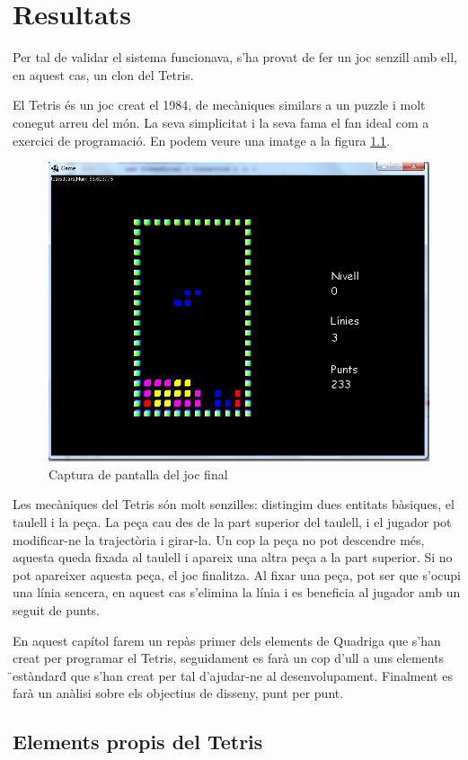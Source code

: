 \chapter{Resultats}
\label{chap:Resultats}

  Per tal de validar el sistema funcionava, s'ha provat de fer un joc senzill amb ell, en aquest cas, un clon del Tetris.
  
  El Tetris és un joc creat el 1984, de mecàniques similars a un puzzle i molt conegut arreu del món. La seva simplicitat i la seva fama el fan ideal com a exercici de programació. En podem veure una imatge a la figura \ref{fig:ImatgeTetris}.
  
  \begin{figure}
    \centering
    \includegraphics[width=0.5\linewidth]{./img/ImatgeTetris.png}
    \caption{Captura de pantalla del joc final \label{fig:ImatgeTetris}}
  \end{figure}
  
  Les mecàniques del Tetris són molt senzilles: distingim dues entitats bàsiques, el taulell i la peça. La peça cau des de la part superior del taulell, i el jugador pot modificar-ne la trajectòria i girar-la. Un cop la peça no pot descendre més, aquesta queda fixada al taulell i apareix una altra peça a la part superior. Si no pot apareixer aquesta peça, el joc finalitza. Al fixar una peça, pot ser que s'ocupi una línia sencera, en aquest cas s'elimina la línia i es beneficia al jugador amb un seguit de punts.

  En aquest capítol farem un repàs primer dels elements de Quadriga que s'han creat per programar el Tetris, seguidament es farà un cop d'ull a uns elements \"{}estàndard\"{} que s'han creat per tal d'ajudar-ne al desenvolupament. Finalment es farà un anàlisi sobre els objectius de disseny, punt per punt.
  
  \section{Elements propis del Tetris}

